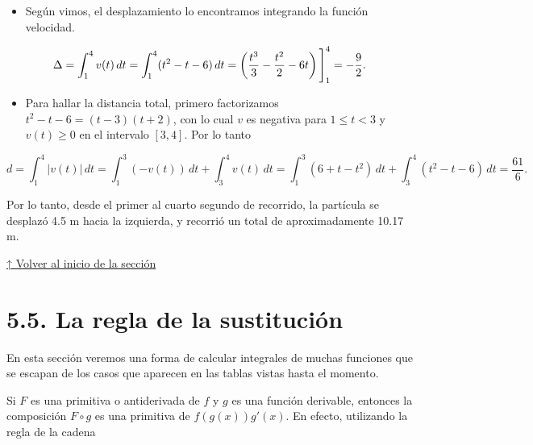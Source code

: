 \documentclass[
  letterpaper,
]{book}
\providecommand{\tightlist}{%
  \setlength{\itemsep}{0pt}\setlength{\parskip}{0pt}}
\theoremstyle{plain}
\theoremstyle{remark}
\begin{document}
\begin{tcolorbox}[enhanced jigsaw, opacityback=0, left=2mm, opacitybacktitle=0.6, toprule=.15mm, bottomrule=.15mm, colbacktitle=quarto-callout-tip-color!10!white, titlerule=0mm, bottomtitle=1mm, title=\textcolor{quarto-callout-tip-color}{\faLightbulb}\hspace{0.5em}{Solución}, toptitle=1mm, colframe=quarto-callout-tip-color-frame, colback=white, breakable, rightrule=.15mm, arc=.35mm, leftrule=.75mm, coltitle=black]

\begin{itemize}
\tightlist
\item
  Según vimos, el desplazamiento lo encontramos integrando la función
  velocidad.
\end{itemize}

\[
\Delta=\int_1^4 v(t)\,dt=\int_1^4 (t^2-t-6)\,dt =\left(\frac{t^3}{3}-\frac{t^2}{2}-6t\right)\Bigg{]}_1^4=-\frac{9}{2}.
\]

\begin{itemize}
\tightlist
\item
  Para hallar la distancia total, primero factorizamos
  \(t^2-t-6=(t-3)(t+2)\), con lo cual \(v\) es negativa para
  \(1\leq t<3\) y \(v(t)\geq 0\) en el intervalo \([3,4]\). Por lo tanto
\end{itemize}

\[
d=\int_1^4 |v(t)|\,dt=\int_1^3 (-v(t))\,dt+\int_3^4 v(t)\,dt=\int_1^3 (6+t-t^2)\,dt+\int_3^4 (t^2-t-6)\,dt=\frac{61}{6}.
\]

Por lo tanto, desde el primer al cuarto segundo de recorrido, la
partícula se desplazó 4.5 m hacia la izquierda, y recorrió un total de
aproximadamente 10.17 m.

\end{tcolorbox}

\hyperref[seccion_5.4]{↑ Volver al inicio de la sección}

\section{5.5. La regla de la sustitución}\label{seccion_5.5}

En esta sección veremos una forma de calcular integrales de muchas
funciones que se escapan de los casos que aparecen en las tablas vistas
hasta el momento.

Si \(F\) es una primitiva o antiderivada de \(f\) y \(g\) es una función
derivable, entonces la composición \(F\circ g\) es una primitiva de
\(f(g(x))g'(x)\). En efecto, utilizando la regla de la cadena
\end{document}
